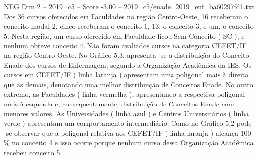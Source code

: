 \begin{textsample}{NEG Dim 2 – 2019\_c5 – Score -3.00 – 2019\_c5/enade\_2019\_enf\_ba60297fd1.txt}
Dos 36 cursos oferecidos em Faculdades na região Centro-Oeste, 16 receberam o conceito modal 2, cinco receberam o conceito 1, 13, o conceito 3, e um, o conceito 5.
Nesta região, um curso oferecido em Faculdade ficou Sem Conceito ( SC ), e nenhum obteve conceito 4.
Não foram avaliados cursos na categoria CEFET/IF na região Centro-Oeste.
No Gráfico 5.3, apresenta -se a distribuição do Conceito Enade dos cursos de Enfermagem, segundo a Organização Acadêmica da IES.
Os cursos em CEFET/IF ( linha laranja ) apresentam uma poligonal mais à direita que as demais, denotando uma melhor distribuição de Conceitos Enade.
No outro extremo, as Faculdades ( linha vermelha ), apresentando a respectiva poligonal mais à esquerda e, consequentemente, distribuição de Conceitos Enade com menores valores.
As Universidades ( linha azul ) e Centros Universitários ( linha verde ) apresentam um comportamento intermediário.
Como no Gráfico 5.2 pode -se observar que a poligonal relativa aos CEFET/IF ( linha laranja ) alcança 100 \% no conceito 4 e isso ocorre porque nenhum curso dessa Organização Acadêmica recebeu conceito 5.

\end{textsample}
